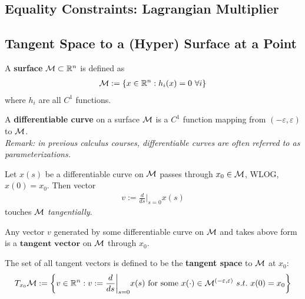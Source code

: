 \documentclass{article}
\begin{document}
   	\subsection{Equality Constraints: Lagrangian Multiplier}
   	\subsection{Tangent Space to a (Hyper) Surface at a Point}
   	\begin{definition}
   		A \textbf{surface} $\mathcal{{M}} \subset \mathbb{R}^n$ is defined as
   		\begin{align}
   			\mathcal{{M}} := \left \{
   			x \in \mathbb{R}^n : h_i (x) = 0\ \forall i
   			\right \}
   		\end{align}
   		where $h_i$ are all $C^1$ functions.
   	\end{definition}
   	
   	\begin{definition}
   		A \textbf{differentiable curve} on a surface $\mathcal{{M}}$ is a $C^1$ function mapping from $(-\varepsilon, \varepsilon)$ to $\mathcal{{M}}$. \\
   		\emph{Remark: in previous calculus courses, differentiable curves are often referred to as parameterizations.}
   	\end{definition}
   	
   	Let $x(s)$ be a differentiable curve on $\mathcal{{M}}$ passes through $x_0 \in \mathcal{{M}}$, WLOG, $x(0) = x_0$. Then vector
   	\begin{align}
   		v := \frac{d}{ds} \bigg \vert_{s=0} x(s)
   	\end{align}
   	touches $\mathcal{{M}}$ \emph{tangentially}.
   	
   	\begin{definition}
   		Any vector $v$ generated by some differentiable curve on $\mathcal{{M}}$ and takes above form is a $\textbf{tangent vector}$ on $\mathcal{{M}}$ through $x_0$.
   	\end{definition}
   	
   	\begin{definition}
   		The set of all tangent vectors is defined to be the \textbf{tangent space} to $\mathcal{{M}}$ at $x_0$:
   		\begin{align}
   			T_{x_0} \mathcal{{M}} := \left \{
   			v \in \mathbb{R}^n
   			:
   			v := \frac{d}{ds} \bigg \vert_{s=0} x(s) \text{{ for some }} x(\cdot) \in \mathcal{{M}}^{(-\varepsilon, \varepsilon)}\ s.t.\ x(0) = x_0
   			\right \}
   		\end{align}
   	\end{definition}
   	
\end{document}
